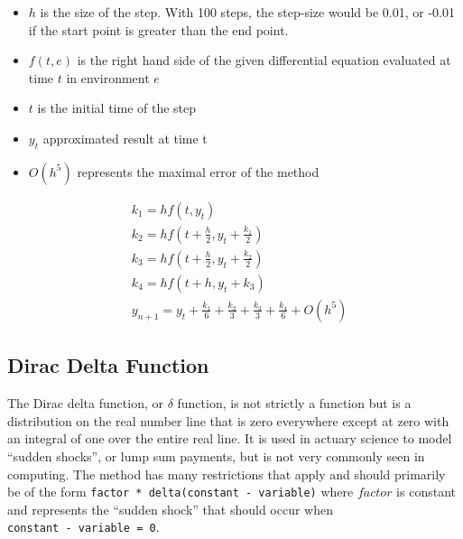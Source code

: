 \begin{itemize}
\item $h$ is the size of the step. With 100 steps, the step-size would be 0.01, or -0.01 if the start point is greater than the end point.
\item $f(t, e)$  is the right hand side of the given differential equation evaluated at time $t$ in environment $e$
\item $t$ is the initial time of the step
\item $y_t$ approximated result at time t
\item $O(h^5)$ represents the maximal error of the method
\end{itemize}

\begin{equation}\begin{aligned}\label{eq:rk4}
&k_1 = h f(t, y_t)\\
&k_2 = h f(t + \frac{h}{2}, y_t + \frac{k_1}{2})\\
&k_3 = h f(t + \frac{h}{2}, y_t + \frac{k_2}{2})\\
&k_4 = h f(t + h, y_t + k_3)\\
&y_{n+1} = y_t + \frac{k_1}{6} + \frac{k_2}{3} + \frac{k_3}{3} + \frac{k_4}{6} + O(h^5)
\end{aligned}\end{equation}


\subsection{Dirac Delta Function}\label{subsec:delta}
The Dirac delta function, or $\delta$ function, is not strictly a function but is a distribution on the real number line that is zero everywhere except at zero with an integral of one over the entire real line.
It is used in actuary science to model ``sudden shocks'', or lump sum payments, but is not very commonly seen in computing.
The method has many restrictions that apply and should primarily be of the form \lstinline$factor * delta(constant - variable)$ where $factor$ is constant and represents the ``sudden shock'' that should occur when \\\lstinline$constant - variable = 0$.

